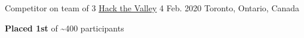 \begin{cventries}


  \cventry
    {Competitor on team of 3} %
    {\href{https://hackthevalley.io/}{Hack the Valley} 4} %
    {Feb. 2020} %
    {Toronto, Ontario, Canada} %
    {
      \begin{cvitems} %
        \item {\textbf{Placed 1st}  of \textasciitilde 400 participants}
      \end{cvitems}
    }

\end{cventries}
